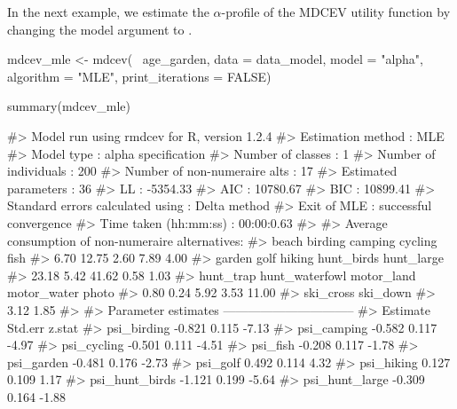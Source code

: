 In the next example, we estimate the \(\alpha\)-profile of the MDCEV
utility function by changing the model argument to .

\begin{Schunk}
\begin{Sinput}
mdcev_mle <- mdcev(~ age_garden,
                   data = data_model,
                   model = "alpha",
                   algorithm = "MLE",
                   print_iterations = FALSE)
\end{Sinput}
\end{Schunk}

\begin{Schunk}
\begin{Sinput}
summary(mdcev_mle)
\end{Sinput}
\begin{Soutput}
#> Model run using rmdcev for R, version 1.2.4 
#> Estimation method                : MLE
#> Model type                       : alpha specification
#> Number of classes                : 1
#> Number of individuals            : 200
#> Number of non-numeraire alts     : 17
#> Estimated parameters             : 36
#> LL                               : -5354.33
#> AIC                              : 10780.67
#> BIC                              : 10899.41
#> Standard errors calculated using : Delta method
#> Exit of MLE                      : successful convergence
#> Time taken (hh:mm:ss)            : 00:00:0.63
#> 
#> Average consumption of non-numeraire alternatives:
#>          beach        birding        camping        cycling           fish 
#>           6.70          12.75           2.60           7.89           4.00 
#>         garden           golf         hiking     hunt_birds     hunt_large 
#>          23.18           5.42          41.62           0.58           1.03 
#>      hunt_trap hunt_waterfowl     motor_land    motor_water          photo 
#>           0.80           0.24           5.92           3.53          11.00 
#>      ski_cross       ski_down 
#>           3.12           1.85 
#> 
#> Parameter estimates --------------------------------  
#>                      Estimate Std.err z.stat
#> psi_birding            -0.821   0.115  -7.13
#> psi_camping            -0.582   0.117  -4.97
#> psi_cycling            -0.501   0.111  -4.51
#> psi_fish               -0.208   0.117  -1.78
#> psi_garden             -0.481   0.176  -2.73
#> psi_golf                0.492   0.114   4.32
#> psi_hiking              0.127   0.109   1.17
#> psi_hunt_birds         -1.121   0.199  -5.64
#> psi_hunt_large         -0.309   0.164  -1.88

\end{Soutput}
\end{Schunk}
